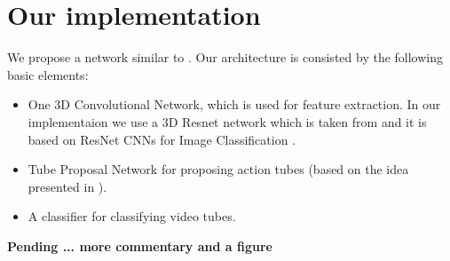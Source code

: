 \documentclass{report}
\begin{document}
\section{Our implementation}
We propose a network similar to \cite{DBLP:journals/corr/HouCS17}. Our architecture is consisted by the following basic elements:
\begin{itemize}
\item One 3D Convolutional Network, which is used for feature extraction. In our implementaion we use a 3D Resnet network which is taken from
  \cite{hara3dcnns} and it is based on ResNet CNNs for Image Classification \cite{DBLP:journals/corr/HeZRS15}.
\item Tube Proposal Network for proposing action tubes (based on the idea presented in \cite{DBLP:journals/corr/HouCS17}).
\item A classifier for classifying video tubes.
\end{itemize}

\textbf{Pending ... more commentary and a figure}

\printbibliography
\end{document}
